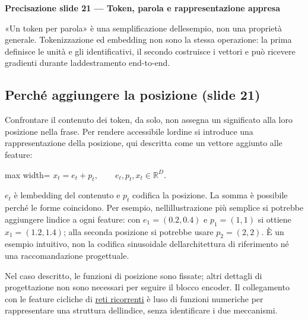 \documentclass[11pt,a4paper,oneside,openany]{book}
\renewenvironment{quote}{\list{}{\leftmargin=1em\rightmargin=0pt}\item\relax}{\endlist}
\begin{document}
\begin{quote}
\textbf{Precisazione slide 21 --- Token, parola e rappresentazione appresa}
\end{quote}

\begin{quote}
«Un token per parola» è una semplificazione dell\textquotesingle esempio, non una proprietà generale. Tokenizzazione ed embedding non sono la stessa operazione: la prima definisce le unità e gli identificativi, il secondo costruisce i vettori e può ricevere gradienti durante l\textquotesingle addestramento end-to-end.
\end{quote}

\subsection{Perché aggiungere la posizione (slide 21)}\label{f04-r315}

Confrontare il contenuto dei token, da solo, non assegna un significato alla loro posizione nella frase. Per rendere accessibile l\textquotesingle ordine si introduce una rappresentazione della posizione, qui descritta come un vettore aggiunto alle feature:

\begin{center}
\begin{adjustbox}{max width=\linewidth}
$\displaystyle \boxed{x_t=e_t+p_t,\qquad e_t,p_t,x_t\in\mathbb R^D.}$
\end{adjustbox}
\end{center}

\(e_t\) è l\textquotesingle embedding del contenuto e \(p_t\) codifica la posizione. La somma è possibile perché le forme coincidono. Per esempio, nell\textquotesingle illustrazione più semplice si potrebbe aggiungere l\textquotesingle indice a ogni feature: con \(e_1=(0.2,0.4)\) e \(p_1=(1,1)\) si ottiene \(x_1=(1.2,1.4)\); alla seconda posizione si potrebbe usare \(p_2=(2,2)\). È un esempio intuitivo, non la codifica sinusoidale dell\textquotesingle architettura di riferimento né una raccomandazione progettuale.

Nel caso descritto, le funzioni di posizione sono fissate; altri dettagli di progettazione non sono necessari per seguire il blocco encoder. Il collegamento con le feature cicliche di \hyperref[fonte03]{reti ricorrenti} è l\textquotesingle uso di funzioni numeriche per rappresentare una struttura dell\textquotesingle indice, senza identificare i due meccanismi.
\end{document}
